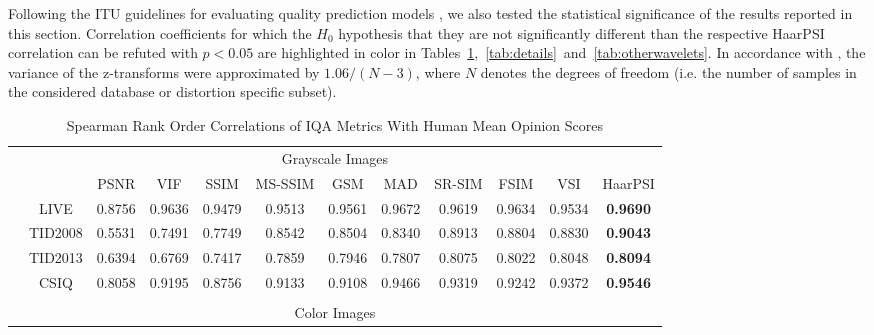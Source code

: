 \documentclass[11pt,a4paper]{article}
\begin{document}
Following the ITU guidelines for evaluating quality prediction models \cite{ITUTP1401}, we also tested the statistical significance of the results reported in this section. Correlation coefficients for which the $H_0$ hypothesis that they are not significantly different than the respective HaarPSI correlation can be refuted with $p < 0.05$ are highlighted in color in Tables~\ref{tab:sroccdatabases},~\ref{tab:details}~and~\ref{tab:otherwavelets}. In accordance with \cite{fieller1957tests}, the variance of the z-transforms were approximated by $1.06/(N - 3)$, where $N$ denotes the degrees of freedom (i.e. the number of samples in the considered database or distortion specific subset).


\setlength{\tabcolsep}{2mm}
\begin{table}[!htb]
	\centering
	\caption{Spearman Rank Order Correlations of IQA Metrics With Human Mean Opinion Scores}
	\label{tab:sroccdatabases}	
	\begin{threeparttable}
		\begin{scriptsize}
			\begin{tabular}{*{12}{c}}
				\toprule[0.5mm]
				\multicolumn{12}{c}{Grayscale Images}\\[0.1cm]
				& & PSNR & VIF & SSIM & MS-SSIM & GSM & MAD & SR-SIM & FSIM & VSI & HaarPSI\\
				& LIVE & \cellcolor{green!25}0.8756 & 0.9636 & \cellcolor{green!25}0.9479 & \cellcolor{green!25}0.9513 & \cellcolor{green!25}0.9561 & 0.9672 & \cellcolor{green!25}0.9619 & 0.9634 & \cellcolor{green!25}0.9534 & \textbf{0.9690}\\
				& TID2008 & \cellcolor{green!25}0.5531 & \cellcolor{green!25}0.7491 & \cellcolor{green!25}0.7749 & \cellcolor{green!25}0.8542 & \cellcolor{green!25}0.8504 & \cellcolor{green!25}0.8340 & 0.8913 & \cellcolor{green!25}0.8804 & \cellcolor{green!25}0.8830 & \textbf{0.9043}\\
				& TID2013 & \cellcolor{green!25}0.6394 & \cellcolor{green!25}0.6769 & \cellcolor{green!25}0.7417 & \cellcolor{green!25}0.7859 & 0.7946 & \cellcolor{green!25}0.7807 & 0.8075 & 0.8022 & 0.8048 & \textbf{0.8094}\\
				& CSIQ & \cellcolor{green!25}0.8058 & \cellcolor{green!25}0.9195 & \cellcolor{green!25}0.8756 & \cellcolor{green!25}0.9133 & \cellcolor{green!25}0.9108 & 0.9466 & \cellcolor{green!25}0.9319 & \cellcolor{green!25}0.9242 & \cellcolor{green!25}0.9372 & \textbf{0.9546}\\
				\\
				\multicolumn{12}{c}{Color Images}\\[0.1cm]

\end{tabular}
\end{scriptsize}
\end{threeparttable}
\end{table}
\end{document}
